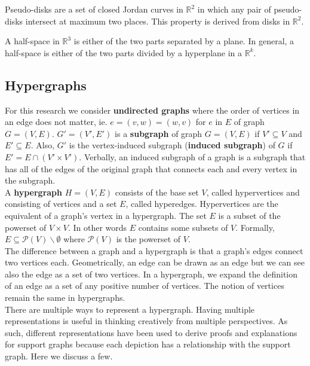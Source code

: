 \documentclass{NSF}
\begin{document}
Pseudo-disks are a set of closed Jordan curves in $\mathbb{R}^2$ in which any pair of pseudo-disks intersect at maximum two places. This property is derived from disks in $\mathbb{R}^2$.

A half-space in $\mathbb{R}^3$ is either of the two parts separated by a plane. In general, a half-space is either of the two parts divided by a hyperplane in a $\mathbb{R}^k$.

\subsection{Hypergraphs}



For this research we consider \textbf{undirected graphs} where the order of vertices in an edge does not matter, ie. $e = (v,w) = (w,v)$ for $e$ in $E$ of graph $G = (V, E)$. $G' = (V', E')$ is a \textbf{subgraph} of graph $G = (V, E)$ if $V' \subseteq V$ and $E' \subseteq E$. Also, $G'$ is the vertex-induced subgraph (\textbf{induced subgraph}) of $G$ if $E' = E \cap (V' \times V') $. Verbally, an induced subgraph of a graph is a subgraph that has all of the edges of the original graph that connects each and every vertex in the subgraph.   \\



A \textbf{hypergraph} $H = (V, E)$ consists of the base set $V$, called hypervertices and consisting of vertices and a set $E$, called hyperedges. Hypervertices are the equivalent of a graph's vertex in a hypergraph. The set $E$ is a subset of the powerset of $V \times V$. In other words $E$ contains some subsets of $V$. Formally, $E \subseteq \mathcal{P}(V)\backslash\emptyset$ where $\mathcal{P}(V)$ is the powerset of $V$. \\

The difference between a graph and a hypergraph is that a graph's edges connect two vertices each. Geometrically, an edge can be drawn as an edge but we can see also the edge as a set of two vertices. In a hypergraph, we expand the definition of an edge as a set of any positive number of vertices. The notion of vertices remain the same in hypergraphs.\\

There are multiple ways to represent a hypergraph. Having multiple representations is useful in thinking creatively from multiple perspectives. As such, different representations have been used to derive proofs and explanations for support graphs because each depiction has a relationship with the support graph. Here we discuss a few.
\end{document}
